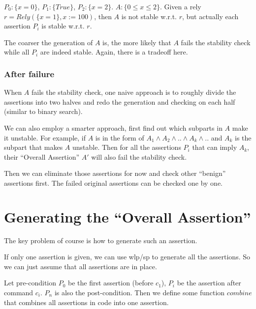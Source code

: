\documentclass[12pt, fleqn]{article}
\begin{document}
$P_0: \{ x = 0 \}$, $P_1: \{ True \}$, $P_2: \{ x = 2 \}$. $A: \{ 0
\le x \le 2 \}$. Given a rely $r = Rely(\{ x = 1 \}, x := 100)$, then
$A$ is not stable w.r.t. $r$, but actually each assertion $P_i$ is
stable w.r.t. $r$.

The coarser the generation of $A$ is, the more likely that $A$ fails
the stability check while all $P_i$ are indeed stable. Again, there is
a tradeoff here.


\subsubsection{After failure}

When $A$ fails the stability check, one naive approach is to roughly
divide the assertions into two halves and redo the generation and
checking on each half (similar to binary search).

We can also employ a smarter approach, first find out which subparts
in $A$ make it unstable. For example, if $A$ is in the form of $A_1
\land A_2 \land .. \land A_k \land ..$ and $A_k$ is the subpart that
makes $A$ unstable. Then for all the assertions $P_i$ that can imply
$A_k$, their ``Overall Assertion'' $A'$ will also fail the stability
check.

Then we can eliminate those assertions for now and check other
``benign'' assertions first. The failed original assertions can be
checked one by one.


\section{Generating the ``Overall Assertion''}

The key problem of course is how to generate such an assertion.

\bigskip


If only one assertion is given, we can use wlp/sp to generate all the
assertions. So we can just assume that all assertions are in place.

Let pre-condition $P_0$ be the first assertion (before $c_1$), $P_i$
be the assertion after command $c_i$. $P_n$ is also the
post-condition. Then we define some function $combine$ that combines
all assertions in code into one assertion.
\end{document}
